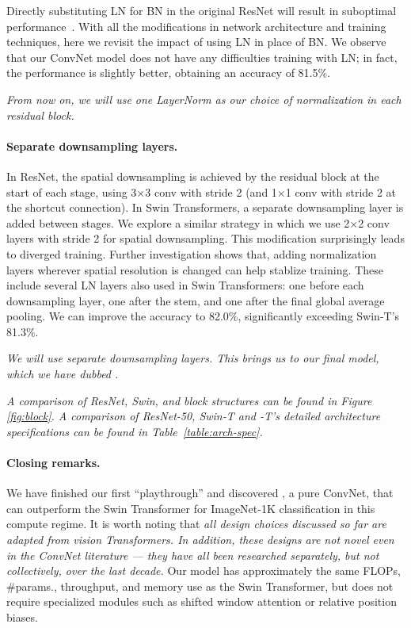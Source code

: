 Directly substituting LN for BN in the original ResNet will result in suboptimal performance~\cite{Wu2018}. With all the modifications in network architecture and training techniques, here we revisit the impact of using LN in place of BN. We observe that our ConvNet model does not have any difficulties training with LN; in fact, the performance is slightly better, obtaining an accuracy of 81.5\%.


\textit{From now on, we will use one LayerNorm as our choice of normalization in each residual block.}
 
\paragraph{Separate downsampling layers.}

In ResNet, the spatial downsampling is achieved by the residual block at the start of each stage, using 3$\times$3 conv with stride 2 (and 1$\times$1 conv with stride 2 at the shortcut connection). In Swin Transformers, a separate downsampling layer is added between stages. We explore a similar strategy in which we use 2$\times$2 conv layers with stride 2 for spatial downsampling. This modification surprisingly leads to diverged training. Further investigation shows that, adding normalization layers wherever spatial resolution is changed can help stablize training. These include several LN layers also used in Swin Transformers: one before each downsampling layer, one after the stem, and one after the final global average pooling. 
We can improve the accuracy to 82.0\%, significantly exceeding Swin-T's 81.3\%.


\textit{
We will use separate downsampling layers. This brings us to our final model, which we have dubbed \cnn{}.}

\textit{A comparison of ResNet, Swin, and \cnn{} block structures can be found in Figure \ref{fig:block}. A comparison of ResNet-50, Swin-T and \cnn{}-T's detailed architecture specifications can be found in Table~\ref{table:arch-spec}.}

\paragraph{Closing remarks.}
We have finished our first ``playthrough'' and discovered \cnn{}, a pure ConvNet, that can outperform the Swin Transformer for ImageNet-1K classification in this compute regime. 
It is worth noting that \emph{all design choices discussed so far are adapted from vision Transformers. \emph{In addition,} these designs are not novel even in the ConvNet literature --- they have all been researched separately, but not collectively, over the last decade.}
Our \cnn{} model has approximately the same FLOPs, \#params., throughput, and memory use as the Swin Transformer, but does not require specialized modules such as shifted window attention or relative position biases. 

